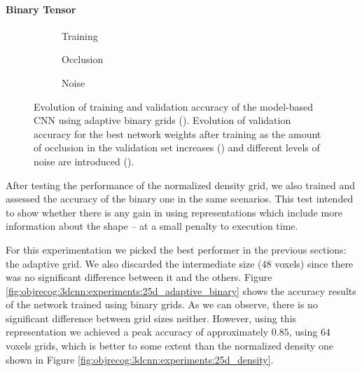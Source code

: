 \paragraph{Binary Tensor}

\begin{figure}[!t]
	\centering
	\begin{subfigure}{\textwidth}
		
		\caption{Training}
		\label{subfig:objrecog:3dcnn:experiments:25d_adaptive_binary}
	\end{subfigure}
	\centering
	\par\bigskip
	\begin{subfigure}{0.49\linewidth}
		
		\caption{Occlusion}
		\label{subfig:objrecog:3dcnn:experiments:25d_adaptive_binary_occlusion}
	\end{subfigure}
	\hfill
	\begin{subfigure}{0.49\linewidth}
		
		\caption{Noise}
		\label{subfig:objrecog:3dcnn:experiments:25d_adaptive_binary_noise}
	\end{subfigure}
	\caption{Evolution of training and validation accuracy of the model-based \acs{CNN} using adaptive binary grids (). Evolution of validation accuracy for the best network weights after training as the amount of occlusion in the validation set increases () and different levels of noise are introduced ().}
	\label{fig:objrecog:3dcnn:experiments:25d_binary}
\end{figure}

After testing the performance of the normalized density grid, we also trained and assessed the accuracy of the binary one in the same scenarios. This test intended to show whether there is any gain in using representations which include more information about the shape -- at a small penalty to execution time.

For this experimentation we picked the best performer in the previous sections: the adaptive grid. We also discarded the intermediate size ($48$ voxels) since there was no significant difference between it and the others. Figure \ref{fig:objrecog:3dcnn:experiments:25d_adaptive_binary} shows the accuracy results of the network trained using binary grids. As we can observe, there is no significant difference between grid sizes neither. However, using this representation we achieved a peak accuracy of approximately $0.85$, using $64$ voxels grids, which is better to some extent than the normalized density one shown in Figure \ref{fig:objrecog:3dcnn:experiments:25d_density}.

